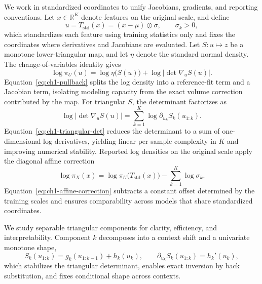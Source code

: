 \documentclass[11pt,a4paper,twoside]{book}\usepackage[]{graphicx}\usepackage[]{xcolor}
\begin{document}
We work in standardized coordinates to unify Jacobians, gradients, and reporting conventions. Let $x \in \mathbb{R}^K$ denote features on the original scale, and define
\begin{equation}
  u = T_{\text{std}}(x) = (x - \mu) \oslash \sigma,
  \qquad \sigma_k > 0,\label{eq:ch1-standardization}
\end{equation}
which standardizes each feature using training statistics only and fixes the coordinates where derivatives and Jacobians are evaluated. Let $S: u \mapsto z$ be a monotone lower-triangular map, and let $\eta$ denote the standard normal density. The change-of-variables identity gives
\begin{equation}
  \log \pi_U(u) = \log \eta\big(S(u)\big) + \log \big|\det \nabla_u S(u)\big|.
  \label{eq:ch1-pullback}
\end{equation}
Equation~\eqref{eq:ch1-pullback} splits the log density into a reference-fit term and a Jacobian term, isolating modeling capacity from the exact volume correction contributed by the map. For triangular $S$, the determinant factorizes as
\begin{equation}
  \log \big|\det \nabla_u S(u)\big| = \sum_{k=1}^K \log \partial_{u_k} S_k(u_{1:k}).
  \label{eq:ch1-triangular-det}
\end{equation}
Equation~\eqref{eq:ch1-triangular-det} reduces the determinant to a sum of one-dimensional log derivatives, yielding linear per-sample complexity in $K$ and improving numerical stability. Reported log densities on the original scale apply the diagonal affine correction
\begin{equation}
  \log \pi_X(x) = \log \pi_U\!\big(T_{\text{std}}(x)\big) - \sum_{k=1}^K \log \sigma_k.
  \label{eq:ch1-affine-correction}
\end{equation}
Equation~\eqref{eq:ch1-affine-correction} subtracts a constant offset determined by the training scales and ensures comparability across models that share standardized coordinates.
\medskip

We study separable triangular components for clarity, efficiency, and interpretability. Component $k$ decomposes into a context shift and a univariate monotone shape,
\begin{equation}
  S_k(u_{1:k}) = g_k(u_{1:k-1}) + h_k(u_k),\qquad \partial_{u_k} S_k(u_{1:k}) = h_k'(u_k),
  \label{eq:ch1-separable}
\end{equation}
which stabilizes the triangular determinant, enables exact inversion by back substitution, and fixes conditional shape across contexts.
\end{document}
